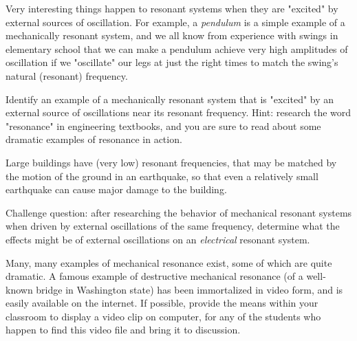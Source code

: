

Very interesting things happen to resonant systems when they are "excited" by external sources of oscillation.  For example, a {\it pendulum} is a simple example of a mechanically resonant system, and we all know from experience with swings in elementary school that we can make a pendulum achieve very high amplitudes of oscillation if we "oscillate" our legs at just the right times to match the swing's natural (resonant) frequency.

Identify an example of a mechanically resonant system that is "excited" by an external source of oscillations near its resonant frequency.  Hint: research the word "resonance" in engineering textbooks, and you are sure to read about some dramatic examples of resonance in action.







Large buildings have (very low) resonant frequencies, that may be matched by the motion of the ground in an earthquake, so that even a relatively small earthquake can cause major damage to the building.

\vskip 10pt

Challenge question: after researching the behavior of mechanical resonant systems when driven by external oscillations of the same frequency, determine what the effects might be of external oscillations on an {\it electrical} resonant system.







Many, many examples of mechanical resonance exist, some of which are quite dramatic.  A famous example of destructive mechanical resonance (of a well-known bridge in Washington state) has been immortalized in video form, and is easily available on the internet.  If possible, provide the means within your classroom to display a video clip on computer, for any of the students who happen to find this video file and bring it to discussion.




